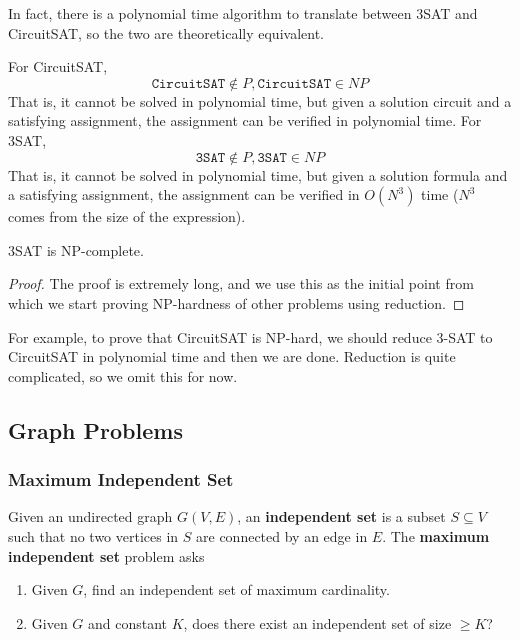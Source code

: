   In fact, there is a polynomial time algorithm to translate between 3SAT and CircuitSAT, so the two are theoretically equivalent. 

  \begin{theorem}
    \label{thm:p-np-classification-of-sat}
    For CircuitSAT, 
    \begin{equation}
      \texttt{CircuitSAT} \not\in P, \texttt{CircuitSAT} \in NP
    \end{equation}
    That is, it cannot be solved in polynomial time, but given a solution circuit and a satisfying assignment, the assignment can be verified in polynomial time. 
    For 3SAT, 
    \begin{equation}
      \texttt{3SAT} \not\in P, \texttt{3SAT} \in NP
    \end{equation}
    That is, it cannot be solved in polynomial time, but given a solution formula and a satisfying assignment, the assignment can be verified in $O(N^3)$ time ($N^3$ comes from the size of the expression). 
  \end{theorem}

  \begin{theorem}
    \label{thm:cook-levin}
    3SAT is NP-complete. 
  \end{theorem} 
  \begin{proof}
    The proof is extremely long, and we use this as the initial point from which we start proving NP-hardness of other problems using reduction. 
  \end{proof}

  For example, to prove that CircuitSAT is NP-hard, we should reduce 3-SAT to CircuitSAT in polynomial time and then we are done. Reduction is quite complicated, so we omit this for now. 

\subsection{Graph Problems}

  \subsubsection{Maximum Independent Set}

    \begin{definition}[MIS]
      \label{def:mis}
      Given an undirected graph $G(V, E)$, an \textbf{independent set} is a subset $S \subseteq V$ such that no two vertices in $S$ are connected by an edge in $E$. The \textbf{maximum independent set} problem asks 
      \begin{enumerate}
        \item Given $G$, find an independent set of maximum cardinality. 
        \item Given $G$ and constant $K$, does there exist an independent set of size $\geq K$? 
      \end{enumerate}
    \end{definition}

